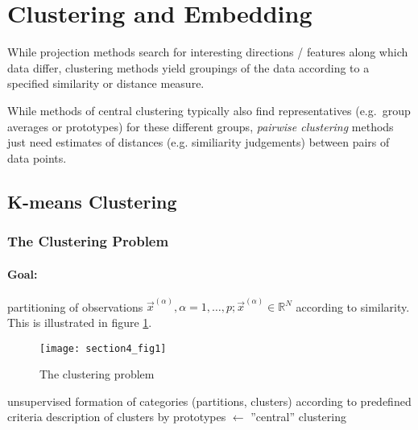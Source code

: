 
\setcounter{equation}{0}
\newpage 
\section{Clustering and Embedding}

While projection methods search for interesting directions / features
along which data differ, clustering methods yield groupings of the
data according to a specified similarity or distance measure.

While methods of central clustering typically also find
representatives (e.g.\ group averages or prototypes) for these different groups,
\emph{pairwise clustering} methods just need estimates of distances
(e.g. similiarity judgements) between pairs of data points. 

\subsection{K-means Clustering}


\subsubsection{The Clustering Problem}
\paragraph{Goal:} partitioning of observations 
$\vec{x}^{(\alpha)}, \alpha = 1, \ldots, p; \vec{x}^{(\alpha)} \in \mathbb{R}^N$
according to similarity. This is illustrated in figure \ref{fig:clusteringProblem}. 
\begin{figure}[h!]
  \centering
  \texttt{[image: section4\_fig1]}  
  \caption{The clustering problem}
  \label{fig:clusteringProblem}
\end{figure}

\begin{itemize}
	\itR unsupervised formation of categories (partitions, clusters) 
		according to predefined criteria
	\itR description of clusters by prototypes $\leftarrow$ ''central'' 
		clustering
\end{itemize}


